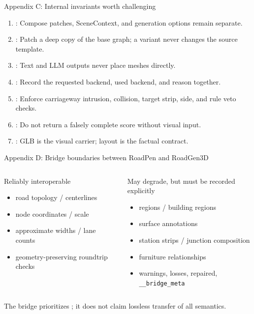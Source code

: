 \documentclass[aspectratio=169,10pt]{ctexbeamer}
\begin{document}
\begin{frame}{Appendix C: Internal invariants worth challenging}
  \begin{enumerate}
    \item {}: Compose patches, SceneContext, and generation options remain separate.
    \item {}: Patch a deep copy of the base graph; a variant never changes the source template.
    \item {}: Text and LLM outputs never place meshes directly.
    \item {}: Record the requested backend, used backend, and reason together.
    \item {}: Enforce carriageway intrusion, collision, target strip, side, and rule veto checks.
    \item {}: Do not return a falsely complete score without visual input.
    \item {}: GLB is the visual carrier; layout is the factual contract.
  \end{enumerate}
\end{frame}

\begin{frame}{Appendix D: Bridge boundaries between RoadPen and RoadGen3D}
  \begin{columns}[T,onlytextwidth]
      \begin{block}{Reliably interoperable}
        \begin{itemize}
          \item road topology / centerlines
          \item node coordinates / scale
          \item approximate widths / lane counts
          \item geometry-preserving roundtrip checks
        \end{itemize}
      \end{block}
      \begin{exampleblock}{May degrade, but must be recorded explicitly}
        \begin{itemize}
          \item regions / building regions
          \item surface annotations
          \item station strips / junction composition
          \item furniture relationships
          \item warnings, losses, repaired, \texttt{\_\_bridge\_meta}
        \end{itemize}
      \end{exampleblock}
  \end{columns}
  \deckgap
  \begin{callout}[Principle]
    The bridge prioritizes ; it does not claim lossless transfer of all semantics.
  \end{callout}
\end{frame}
\end{document}
